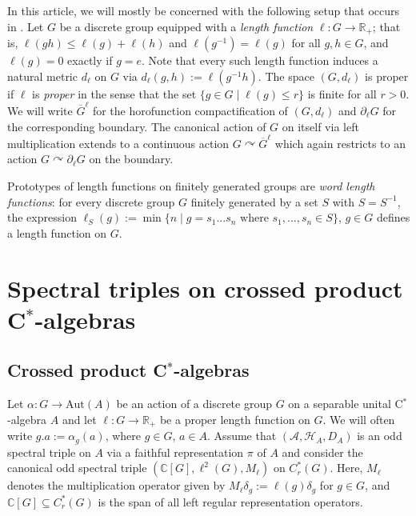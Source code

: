 \documentclass[a4paper,11pt,reqno]{amsart}
\numberwithin{equation}{section}
\numberwithin{equation}{section}
\theoremstyle{definition}
\theoremstyle{remark}
\theoremstyle{remark}
\begin{document}
In this article, we will mostly be concerned with the following setup
that occurs in \cite{Connes89}. Let $G$ be a discrete group equipped
with a \emph{length function} $\ell:G\rightarrow\mathbb{R}_{+}$; that is, $\ell(gh)\leq\ell(g)+\ell(h)$ and $\ell(g^{-1})=\ell(g)$
for all $g,h\in G$, and $\ell(g)=0$ exactly if $g=e$. Note that
every such length function induces a natural metric $d_{\ell}$ on
$G$ via $d_{\ell}(g,h):=\ell(g^{-1}h)$. The space $(G,d_{\ell})$
is proper if $\ell$ is \emph{proper} in the sense that the set $\{g\in G\mid\ell(g)\leq r\}$
is finite for all $r>0$. We will write $\overline{G}^{\ell}$ for
the horofunction compactification of $(G,d_{\ell})$ and $\partial_{\ell}G$
for the corresponding boundary. The canonical action of $G$ on itself
via left multiplication extends to a continuous action $G\curvearrowright\overline{G}^{\ell}$
which again restricts to an action $G\curvearrowright\partial_{\ell}G$ on the boundary.

Prototypes of length functions on finitely generated groups are \emph{word
length functions}: for every discrete group $G$ finitely generated
by a set $S$ with $S=S^{-1}$, the expression $\ell_{S}(g):=\min\{n\mid g=s_{1}...s_{n}\text{ where }s_{1},...,s_{n}\in S\}$,
$g\in G$ defines a length function on $G$.

\vspace{3mm}


\section{Spectral triples on crossed product C$^{\ast}$-algebras}

\vspace{3mm}



\subsection{Crossed product C$^{\ast}$-algebras\label{subsec:Crossed-product-C-algebras}}

Let $\alpha:G\rightarrow\text{Aut}(A)$ be an action of a discrete
group $G$ on a separable unital C$^{\ast}$-algebra $A$ and let
$\ell:G\rightarrow\mathbb{R}_{+}$ be a proper length function on
$G$. We will often write $g.a:=\alpha_{g}(a)$, where $g\in G$, $a\in A$.
Assume that $(\mathcal{A},\mathcal{H}_{A},D_{A})$ is an odd spectral
triple on $A$ via a faithful representation $\pi$ of $A$ and consider
the canonical odd spectral triple $(\mathbb{C}[G],\ell^{2}(G),M_{\ell})$
on $C_{r}^{\ast}(G)$. Here, $M_{\ell}$ denotes the multiplication
operator given by $M_{\ell}\delta_{g}:=\ell(g)\delta_{g}$ for $g\in G$,
and $\mathbb{C}[G]\subseteq C_{r}^{\ast}(G)$ is the span of all left
regular representation operators.
\end{document}
